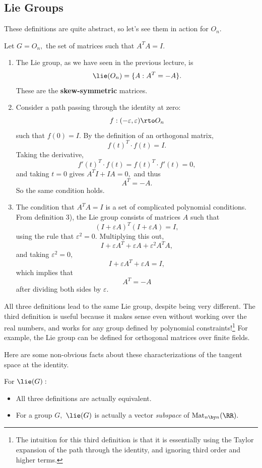 \subsection{Lie Groups}
These definitions are quite abstract, so let's see them in action for $O_n.$ 
\begin{example}
Let $G = O_n,$ the set of matrices such that $A^TA = I.$
\end{example}
\begin{enumerate}
    \item The Lie group, as we have seen in the previous lecture, is \[\lie(O_n) = \{A: A^T = -A\}.\] These are the \textbf{skew-symmetric} matrices.
    \item Consider a path passing through the identity at zero: \[f: (-\varepsilon, \varepsilon) \rto O_n\] such that $f(0) = I.$ By the definition of an orthogonal matrix, \[f(t)^T\cdot f(t) = I.\] Taking the derivative, \[f'(t)^T \cdot f(t) = f(t)^T \cdot f'(t) = 0,\] and taking $t = 0$ gives $A^TI + IA = 0,$ and thus \[A^T = -A.\] So the same condition holds.
    \item The condition that $A^TA = I$ is a set of complicated polynomial conditions. From definition 3), the Lie group consists of matrices $A$ such that \[(I + \varepsilon A)^T(I + \varepsilon A) = I,\] using the rule that $\varepsilon^2 = 0.$ Multiplying this out, \[I + \varepsilon A^T + \varepsilon A + \varepsilon^2 A^TA,\] and taking $\varepsilon^2 = 0,$ \[I + \varepsilon A^T + \varepsilon A = I,\] which implies that \[A^T = -A\] after dividing both sides by $\varepsilon.$
\end{enumerate}

All three definitions lead to the same Lie group, despite being very different. The third definition is useful because it makes sense even without working over the real numbers, and works for any group defined by polynomial constraints!\footnote{The intuition for this third definition is that it is essentially using the Taylor expansion of the path through the identity, and ignoring third order and higher terms.} For example, the Lie group can be defined for orthogonal matrices over finite fields.

Here are some non-obvious facts about these characterizations of the tangent space at the identity. 
\begin{proposition}
For $\lie(G):$
\begin{itemize}
    \item All three definitions are actually equivalent.
    \item For a group $G,$ $\lie(G)$ is actually a vector \emph{subspace} of $\text{Mat}_{n \by n}(\RR).$
\end{itemize}
\end{proposition}

